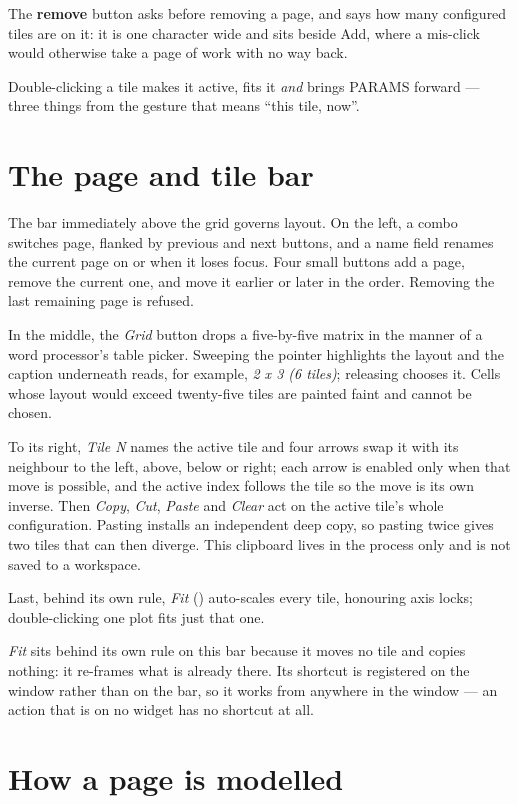 \documentclass[11pt,a4paper,oneside]{report}
\newcommand{\key}[1]{\textsf{\small\fbox{#1}}}
\begin{document}
The \textbf{remove} button asks before removing a page, and says how many
configured tiles are on it: it is one character wide and sits beside Add, where
a mis-click would otherwise take a page of work with no way back.

Double-clicking a tile makes it active, fits it \emph{and} brings PARAMS
forward --- three things from the gesture that means ``this tile, now''.
\label{ch:pages}

\section{The page and tile bar}

The bar immediately above the grid governs layout. On the left, a combo switches
page, flanked by previous and next buttons, and a name field renames the current
page on \key{Enter} or when it loses focus. Four small buttons add a page,
remove the current one, and move it earlier or later in the order. Removing the
last remaining page is refused.

In the middle, the \emph{Grid} button drops a five-by-five matrix in the manner
of a word processor's table picker. Sweeping the pointer highlights the layout
and the caption underneath reads, for example, \emph{2 x 3 (6 tiles)}; releasing
chooses it. Cells whose layout would exceed twenty-five tiles are painted faint
and cannot be chosen.

To its right, \emph{Tile N} names the active tile and four arrows swap it with
its neighbour to the left, above, below or right; each arrow is enabled only when
that move is possible, and the active index follows the tile so the move is its
own inverse. Then \emph{Copy}, \emph{Cut}, \emph{Paste} and \emph{Clear} act
on the active tile's whole configuration. Pasting installs an independent deep
copy, so pasting twice gives two tiles that can then diverge. This clipboard
lives in the process only and is not saved to a workspace.

Last, behind its own rule, \emph{Fit} (\key{Ctrl+0}) auto-scales every tile,
honouring axis locks; double-clicking one plot fits just that one.

\emph{Fit} sits behind its own rule on this bar because it moves no tile and
copies nothing: it re-frames what is already there. Its shortcut is registered
on the window rather than on the bar, so it works from anywhere in the window
--- an action that is on no widget has no shortcut at all.

\section{How a page is modelled}
\end{document}
